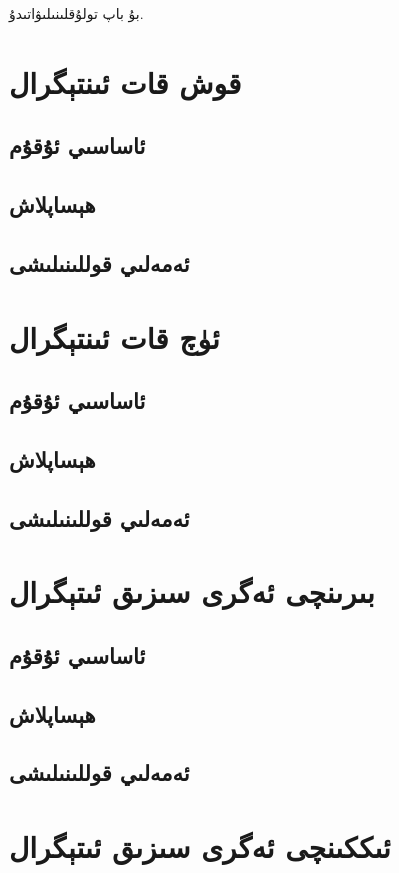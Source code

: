 بۇ باپ تولۇقلىنىلىۋاتىدۇ.

\section{قوش قات ئىنتېگرال}
\subsection{ئاساسىي ئۇقۇم}
\subsection{ھېساپلاش}
\subsection{ئەمەلىي قوللىنىلىشى}

\section{ئۈچ قات ئىنتېگرال}
\subsection{ئاساسىي ئۇقۇم}
\subsection{ھېساپلاش}
\subsection{ئەمەلىي قوللىنىلىشى}

\section{بىرىنچى ئەگرى سىزىق ئىتېگرال}
\subsection{ئاساسىي ئۇقۇم}
\subsection{ھېساپلاش}
\subsection{ئەمەلىي قوللىنىلىشى}

\section{ئىككىنچى ئەگرى سىزىق ئىتېگرال}
